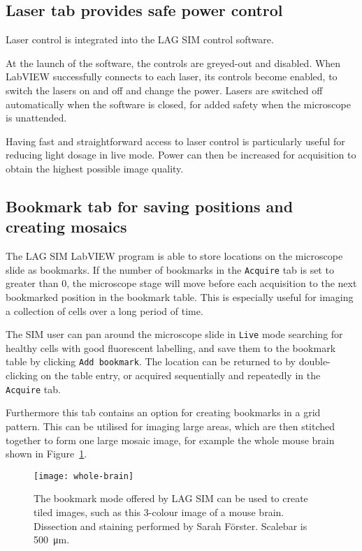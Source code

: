 \subsection{Laser tab provides safe power control}
Laser control is integrated into the LAG SIM control software.

At the launch of the software, the controls are greyed-out and disabled.
When LabVIEW successfully connects to each laser, its controls become enabled, to switch the lasers on and off and change the power.
Lasers are switched off automatically when the software is closed, for added safety when the microscope is unattended.

Having fast and straightforward access to laser control is particularly useful for reducing light dosage in live mode.
Power can then be increased for acquisition to obtain the highest possible image quality.

\subsection{Bookmark tab for saving positions and creating mosaics} \label{sec:lagsimBookmarks}
The LAG SIM LabVIEW program is able to store locations on the microscope slide as bookmarks.
If the number of bookmarks in the \texttt{Acquire} tab is set to greater than 0, the microscope stage will move before each acquisition to the next bookmarked position in the bookmark table.
This is especially useful for imaging a collection of cells over a long period of time.

The SIM user can pan around the microscope slide in \texttt{Live} mode searching for healthy cells with good fluorescent labelling, and save them to the bookmark table by clicking \texttt{Add bookmark}.
The location can be returned to by double-clicking on the table entry, or acquired sequentially and repeatedly in the \texttt{Acquire} tab.

Furthermore this tab contains an option for creating bookmarks in a grid pattern.
This can be utilised for imaging large areas, which are then stitched together to form one large mosaic image, for example the whole mouse brain shown in Figure~\ref{fig:wholebrain}.

\begin{figure}[p]
\centering
\texttt{[image: whole-brain]}
\caption[LAG SIM: An image of a full mouse brain can be captured as a mosaic of images]{The bookmark mode offered by LAG SIM can be used to create tiled images, such as this 3-colour image of a mouse brain. Dissection and staining performed by Sarah F{\"o}rster. Scalebar is \SI{500}{\micro\metre}.}
\label{fig:wholebrain}
\end{figure}

